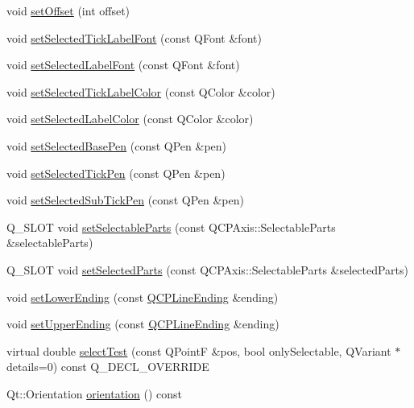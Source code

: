 \begin{DoxyCompactItemize}
\item 
void \hyperlink{class_q_c_p_axis_a04a652603cbe50eba9969ee6d68873c3}{set\+Offset} (int offset)
\item 
void \hyperlink{class_q_c_p_axis_a845ccb560b7bc5281098a5be494145f6}{set\+Selected\+Tick\+Label\+Font} (const Q\+Font \&font)
\item 
void \hyperlink{class_q_c_p_axis_a02ec2a75d4d8401eaab834fbc6803d30}{set\+Selected\+Label\+Font} (const Q\+Font \&font)
\item 
void \hyperlink{class_q_c_p_axis_a9bdbf5e63ab15187f3a1de9440129227}{set\+Selected\+Tick\+Label\+Color} (const Q\+Color \&color)
\item 
void \hyperlink{class_q_c_p_axis_a5d502dec597c634f491fdd73d151c72d}{set\+Selected\+Label\+Color} (const Q\+Color \&color)
\item 
void \hyperlink{class_q_c_p_axis_aeb917a909215605b95ef2be843de1ee8}{set\+Selected\+Base\+Pen} (const Q\+Pen \&pen)
\item 
void \hyperlink{class_q_c_p_axis_a8360502685eb782edbf04019c9345cdc}{set\+Selected\+Tick\+Pen} (const Q\+Pen \&pen)
\item 
void \hyperlink{class_q_c_p_axis_a2a00a7166600155eac26843132eb9576}{set\+Selected\+Sub\+Tick\+Pen} (const Q\+Pen \&pen)
\item 
Q\+\_\+\+S\+L\+OT void \hyperlink{class_q_c_p_axis_a513f9b9e326c505d9bec54880031b085}{set\+Selectable\+Parts} (const Q\+C\+P\+Axis\+::\+Selectable\+Parts \&selectable\+Parts)
\item 
Q\+\_\+\+S\+L\+OT void \hyperlink{class_q_c_p_axis_ab9d7a69277dcbed9119b3c1f25ca19c3}{set\+Selected\+Parts} (const Q\+C\+P\+Axis\+::\+Selectable\+Parts \&selected\+Parts)
\item 
void \hyperlink{class_q_c_p_axis_a08af1c72db9ae4dc8cb8a973d44405ab}{set\+Lower\+Ending} (const \hyperlink{class_q_c_p_line_ending}{Q\+C\+P\+Line\+Ending} \&ending)
\item 
void \hyperlink{class_q_c_p_axis_a69119b892fc306f651763596685aa377}{set\+Upper\+Ending} (const \hyperlink{class_q_c_p_line_ending}{Q\+C\+P\+Line\+Ending} \&ending)
\item 
virtual double \hyperlink{class_q_c_p_axis_a63b7103c57fe9acfbce164334ea837f8}{select\+Test} (const Q\+PointF \&pos, bool only\+Selectable, Q\+Variant $\ast$details=0) const Q\+\_\+\+D\+E\+C\+L\+\_\+\+O\+V\+E\+R\+R\+I\+DE
\item 
Qt\+::\+Orientation \hyperlink{class_q_c_p_axis_ab988ef4538e2655bb77bd138189cd42e}{orientation} () const
\item 

\end{DoxyCompactItemize}
